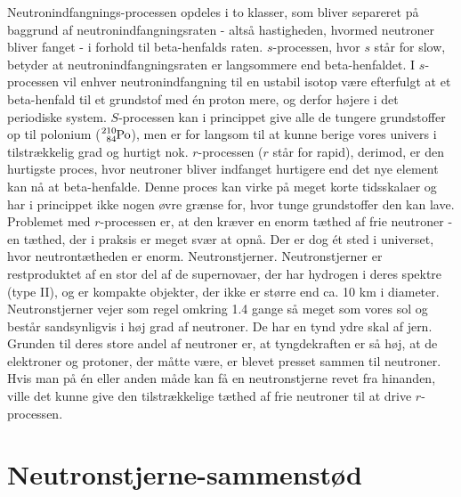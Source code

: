 \documentclass[twocolumn]{article}
\begin{document}
Neutronindfangnings-processen opdeles i to klasser, som bliver separeret på baggrund af neutronindfangningsraten - altså hastigheden, hvormed neutroner bliver fanget - i forhold til beta-henfalds raten. $s$-processen, hvor $s$ står for slow, betyder at neutronindfangningsraten er langsommere end beta-henfaldet. I $s$-processen vil enhver neutronindfangning til en ustabil isotop være efterfulgt at et beta-henfald til et grundstof med én proton mere, og derfor højere i det periodiske system. $S$-processen kan i princippet give alle de tungere grundstoffer op til polonium ($\ce{_{84}^{210}Po}$), men er for langsom til at kunne berige vores univers i tilstrækkelig grad og hurtigt nok. $r$-processen ($r$ står for rapid), derimod, er den hurtigste proces, hvor neutroner bliver indfanget hurtigere end det nye element kan nå at beta-henfalde. Denne proces kan virke på meget korte tidsskalaer og har i princippet ikke nogen øvre grænse for, hvor tunge grundstoffer den kan lave. Problemet med $r$-processen er, at den kræver en enorm tæthed af frie neutroner - en tæthed, der i praksis er meget svær at opnå. Der er dog ét sted i universet, hvor neutrontætheden er enorm. Neutronstjerner. Neutronstjerner er restproduktet af en stor del af de supernovaer, der har hydrogen i deres spektre (type II), og er kompakte objekter, der ikke er større end ca. 10 km i diameter. Neutronstjerner vejer som regel omkring 1.4 gange så meget som vores sol og består sandsynligvis i høj grad af neutroner. De har en tynd ydre skal af jern. Grunden til deres store andel af neutroner er, at tyngdekraften er så høj, at de elektroner og protoner, der måtte være, er blevet presset sammen til neutroner. Hvis man på én eller anden måde kan få en neutronstjerne revet fra hinanden, ville det kunne give den tilstrækkelige tæthed af frie neutroner til at drive $r$-processen.

\section{Neutronstjerne-sammenstød}\label{ns}
\end{document}
